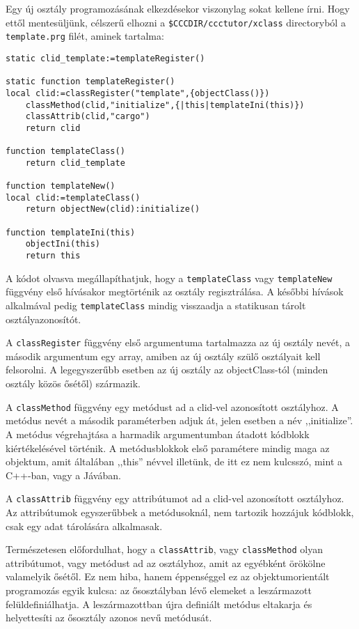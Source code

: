 Egy új osztály programozásának elkezdésekor viszonylag sokat
kellene írni. Hogy ettől mentesüljünk, célszerű elhozni a 
\verb!$CCCDIR/ccctutor/xclass! directoryból a \verb!template.prg! 
filét, aminek tartalma:
\begin{verbatim}
static clid_template:=templateRegister()

static function templateRegister()
local clid:=classRegister("template",{objectClass()})
    classMethod(clid,"initialize",{|this|templateIni(this)})
    classAttrib(clid,"cargo")
    return clid

function templateClass()
    return clid_template

function templateNew()
local clid:=templateClass()
    return objectNew(clid):initialize()

function templateIni(this)
    objectIni(this)
    return this
\end{verbatim}
A kódot olvasva megállapíthatjuk, hogy 
a \verb!templateClass!  vagy \verb!templateNew! függvény első
hívásakor megtörténik az osztály regisztrálása. A későbbi hívások
alkalmával pedig \verb!templateClass! mindig visszaadja a 
statikusan tárolt osztályazonosítót.

A \verb!classRegister! függvény első argumentuma tartalmazza az új
osztály nevét, a második argumentum egy array, amiben az új osztály
szülő osztályait kell felsorolni. A legegyszerűbb esetben az új
osztály az objectClass-tól (minden osztály közös ősétől) származik.

A \verb!classMethod! függvény egy metódust ad a clid-vel azonosított
osztályhoz. A metódus nevét a második paraméterben adjuk át, jelen 
esetben a név ,,initialize''. A metódus végrehajtása a harmadik argumentumban 
átadott kódblokk kiértékelésével történik. A metódusblokkok első 
paramétere mindig maga az objektum, amit általában ,,this'' névvel
illetünk, de itt ez nem kulcsszó, mint a C++-ban, vagy a Jávában.

A \verb!classAttrib! függvény egy attribútumot ad a clid-vel azonosított
osztályhoz. Az attribútumok egyszerűbbek a metódusoknál, nem tartozik
hozzájuk kódblokk, csak egy adat tárolására alkalmasak.


Természetesen előfordulhat, hogy a \verb!classAttrib!, vagy 
\verb!classMethod! olyan attribútumot, vagy metódust ad az osztályhoz,
amit az egyébként örökölne valamelyik ősétől. Ez nem hiba, hanem
éppenséggel ez az objektumorientált programozás egyik kulcsa:
az ősosztályban lévő elemeket a leszármazott felüldefiniálhatja.
A leszármazottban újra definiált metódus eltakarja és helyettesíti
az ősosztály azonos nevű metódusát.


